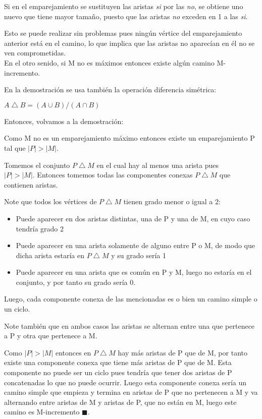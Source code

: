 \documentclass[a4paper,1pt]{report}
\begin{document}
Si en el emparejamiento se sustituyen las aristas \textit{si} por las \textit{no}, se obtiene uno nuevo que tiene mayor tamaño, puesto que las aristas \textit{no}  exceden en 1 a las \textit{si}.

Esto se puede realizar sin problemas pues ningún vértice del emparejamiento anterior está en el camino, lo que implica que las aristas no aparecían en él no se ven comprometidas.\\

En el otro senido, si M no es máximos entonces existe algún camino M-incremento.



En la demostración se usa también la operación diferencia simétrica:

$A\bigtriangleup B = (A\cup B) / (A\cap B)$

Entonces, volvamos a la demostración:

Como M no es un emparejamiento máximo entonces existe un emparejamiento P tal que $|P|>|M|$.

Tomemos el conjunto $P\bigtriangleup M$ en el cual hay al menos una arista pues \\
$|P|>|M|$. Entonces tomemos todas las componentes conexas $P\bigtriangleup M$ que contienen aristas. 

Note que todos los vértices de $P\bigtriangleup M$ tienen grado menor o igual a 2:
\begin{itemize}
 \item Puede aparecer en dos aristas distintas, una de P y una de M, en cuyo caso tendría grado 2
 \item Puede aparecer en una arista solamente de alguno entre P o M, de modo que dicha arista estaría en $P\bigtriangleup M$ y su grado sería 1
 \item Puede aparecer en una arista que es común en P y M, luego no estaría en el conjunto, y por tanto su grado sería 0.
\end{itemize}

Luego, cada componente conexa de las mencionadas es o bien un camino simple o un ciclo. 

Note también que en ambos casos las aristas se alternan entre una que pertenece a P y otra que pertenece a M.

Como $|P|>|M|$ entonces en $P\bigtriangleup M$ hay más aristas de P que de M, por tanto existe una componente conexa que tiene más aristas de P que de M. Esta componente no puede ser un ciclo pues tendría que tener dos aristas de P concatenadas lo que no puede ocurrir. Luego esta componente conexa sería un camino simple que empieza y termina en aristas de P que no pertenecen a M y va alternando entre aristas de M y aristas de P, que no están en M, luego este camino es M-incremento $\blacksquare$.
\end{document}
